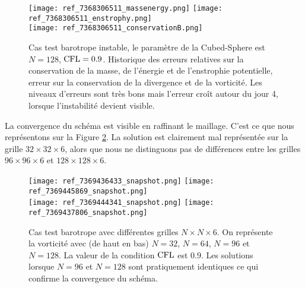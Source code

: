 \begin{figure}[htbp]
\begin{center}
\texttt{[image: ref\_7368306511\_massenergy.png]}
\texttt{[image: ref\_7368306511\_enstrophy.png]}\\
\texttt{[image: ref\_7368306511\_conservationB.png]}
\end{center}
\caption{Cas test barotrope instable, le paramètre de la Cubed-Sphere est $N=128$, $\text{CFL}=0.9$. Historique des erreurs relatives sur la conservation de la masse, de l'énergie et de l'enstrophie potentielle, erreur sur la conservation de la divergence et de la vorticité. Les niveaux d'erreurs sont très bons mais l'erreur croît autour du jour 4, lorsque l'instabilité devient visible.}
\label{fig: galewsky conservation}
\end{figure}

La convergence du schéma est visible en raffinant le maillage. C'est ce que nous représentons sur la Figure \ref{fig: galewsky convergence}. La solution est clairement mal représentée sur la grille $32 \times 32 \times 6$, alors que nous ne distinguons pas de différences entre les grilles $96 \times 96\times 6$ et $128 \times 128\times 6$.

\begin{figure}[htbp]
\begin{center}
\texttt{[image: ref\_7369436433\_snapshot.png]}
\texttt{[image: ref\_7369445869\_snapshot.png]}\\
\texttt{[image: ref\_7369444341\_snapshot.png]}
\texttt{[image: ref\_7369437806\_snapshot.png]}
\end{center}
\caption{Cas test barotrope avec différentes grilles $N \times N \times 6$. On représente la vorticité avec (de haut en bas) $N=32$, $N=64$, $N=96$ et $N=128$. La valeur de la condition $\text{CFL}$ est $0.9$. Les solutions lorsque $N=96$ et $N=128$ sont pratiquement identiques ce qui confirme la convergence du schéma.}
\label{fig: galewsky convergence}
\end{figure}



























